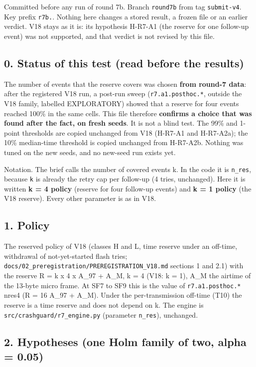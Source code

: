 


Committed before any run of round 7b. Branch \texttt{round7b} from tag \texttt{submit-v4}. Key prefix \texttt{r7b.}. Nothing here changes a stored result, a frozen file or an earlier verdict. V18 stays as it is: its hypothesis H-R7-A1 (the reserve for one follow-up event) was not supported, and that verdict is not revised by this file.

\subsection*{0. Status of this test (read before the results)}

The number of events that the reserve covers was chosen \textbf{from round-7 data}: after the registered V18 run, a post-run sweep (\texttt{r7.a1.posthoc.*}, outside the V18 family, labelled EXPLORATORY) showed that a reserve for four events reached 100\% in the same cells. This file therefore \textbf{confirms a choice that was found after the fact, on fresh seeds}. It is not a blind test. The 99\% and 1-point thresholds are copied unchanged from V18 (H-R7-A1 and H-R7-A2a); the 10\% median-time threshold is copied unchanged from H-R7-A2b. Nothing was tuned on the new seeds, and no new-seed run exists yet.

Notation. The brief calls the number of covered events k. In the code it is \texttt{n\_res}, because \texttt{k} is already the retry cap per follow-up (4 tries, unchanged). Here it is written \textbf{k = 4 policy} (reserve for four follow-up events) and \textbf{k = 1 policy} (the V18 reserve). Every other parameter is as in V18.

\subsection*{1. Policy}

The reserved policy of V18 (classes H and L, time reserve under an off-time, withdrawal of not-yet-started flash tries; \texttt{docs/02\_preregistration/PREREGISTRATION\_V18.md} sections 1 and 2.1) with the reserve R = k x 4 x A\_97 + A\_M, k = 4 (V18: k = 1), A\_M the airtime of the 13-byte micro frame. At SF7 to SF9 this is the value of \texttt{r7.a1.posthoc.*} nres4 (R = 16 A\_97 + A\_M). Under the per-transmission off-time (T10) the reserve is a time reserve and does not depend on k. The engine is \texttt{src/crashguard/r7\_engine.py} (parameter \texttt{n\_res}), unchanged.

\subsection*{2. Hypotheses (one Holm family of two, alpha = 0.05)}

